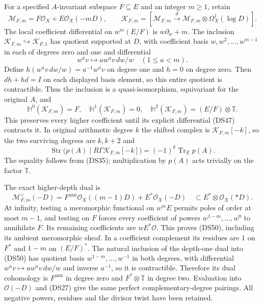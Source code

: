 \documentclass{article}
\begin{document}
For a specified $A$-invariant subspace $F\subseteq E$ and an integer
$m\geq1$, retain
\[
 \mathcal M_{F,m}=F\mathcal O_X+E\mathcal O_X(-mD),\qquad
 \mathscr K_{F,m}=[\mathcal M_{F,m}\xrightarrow d
  \mathcal M_{F,m}\otimes\Omega_X^1(\log D)].
 \tag{DS46}
\]
The local coefficient differential on $w^m(E/F)$ is
$w\partial_w+m$.  The inclusion $\mathscr K_{F,m}\hookrightarrow
\mathscr K_{F,1}$ has quotient supported at $D$, with coefficient
basis $w,w^2,\ldots,w^{m-1}$ in each of degrees zero and one and
differential
\[
 w^a v\longmapsto a w^a v\,dw/w\quad(1\leq a<m).
 \tag{DS47}
\]
Define $h(w^av\,dw/w)=a^{-1}w^av$ on degree one and $h=0$ on
degree zero.  Then $dh+hd=I$ on each displayed basis element, so
this entire quotient is contractible.  Thus the inclusion is a
quasi-isomorphism, equivariant for the original $A$, and
\[
 \mathbb H^0(\mathscr K_{F,m})=F,\quad
 \mathbb H^1(\mathscr K_{F,m})=0,\quad
 \mathbb H^2(\mathscr K_{F,m})=(E/F)\otimes\mathbb T.
 \tag{DS48}
\]
This preserves every higher coefficient until its explicit
differential (DS47) contracts it.  In original arithmetic degree $k$
the shifted complex is $\mathscr K_{F,m}[-k]$, so the two surviving
degrees are $k,k+2$ and
\[
 \operatorname{Str}\bigl(p(A)\mid R\Gamma\mathscr K_{F,m}[-k]\bigr)
 =(-1)^k\operatorname{Tr}_E p(A).
 \tag{DS49}
\]
The equality follows from (DS35); multiplication by $p(A)$ acts
trivially on the factor $\mathbb T$.

The exact higher-depth dual is
\[
 \mathcal M_{F,m}^\vee(-D)
 =F^{\mathrm{ann}}\mathcal O_X((m-1)D)
   +E^*\mathcal O_X(-D)
 \quad\subset E^*\otimes\mathcal O_X(*D).
 \tag{DS50}
\]
At infinity, testing a meromorphic functional on $w^mE$ permits
poles of order at most $m-1$, and testing on $F$ forces every
coefficient of powers $w^{1-m},\ldots,w^0$ to annihilate $F$.
Its remaining coefficients are $wE^*\mathcal O$.  This proves
(DS50), including its ambient meromorphic sheaf.  In a coefficient
complement its residues are $1$ on $F^*$ and $1-m$ on
$(E/F)^*$.  The natural inclusion of the depth-one dual into
(DS50) has quotient basis $w^{1-m},\ldots,w^{-1}$ in both degrees,
with differential $w^av\mapsto a w^av\,dw/w$ and inverse
$a^{-1}$, so it is contractible.  Therefore its dual cohomology is
$F^{\mathrm{ann}}$ in degree zero and $F^*\otimes\mathbb T$ in
degree two.  Evaluation into $\mathcal O(-D)$ and (DS27) give
the same perfect complementary-degree pairings.  All negative
powers, residues and the divisor twist have been retained.
\end{document}
